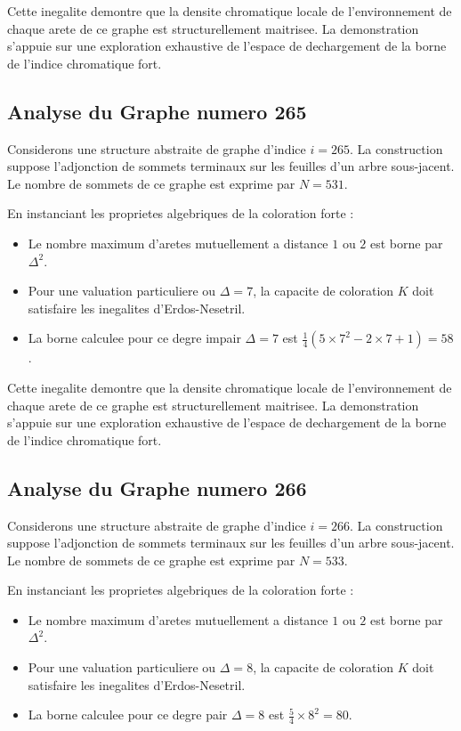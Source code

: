 \documentclass[11pt,a4paper]{article}
\begin{document}
Cette inegalite demontre que la densite chromatique locale de l'environnement de chaque arete de ce graphe est structurellement maitrisee. La demonstration s'appuie sur une exploration exhaustive de l'espace de dechargement de la borne de l'indice chromatique fort.

\subsection{Analyse du Graphe numero 265}
Considerons une structure abstraite de graphe d'indice $i = 265$. La construction suppose l'adjonction de sommets terminaux sur les feuilles d'un arbre sous-jacent. Le nombre de sommets de ce graphe est exprime par $N = 531$.

En instanciant les proprietes algebriques de la coloration forte :
\begin{itemize}
\item Le nombre maximum d'aretes mutuellement a distance $1$ ou $2$ est borne par $\Delta^2$.
\item Pour une valuation particuliere ou $\Delta = 7$, la capacite de coloration $K$ doit satisfaire les inegalites d'Erdos-Nesetril.
\item La borne calculee pour ce degre impair $\Delta = 7$ est $\frac{1}{4}(5 \times 7^2 - 2 \times 7 + 1) = 58$.
\end{itemize}

Cette inegalite demontre que la densite chromatique locale de l'environnement de chaque arete de ce graphe est structurellement maitrisee. La demonstration s'appuie sur une exploration exhaustive de l'espace de dechargement de la borne de l'indice chromatique fort.

\subsection{Analyse du Graphe numero 266}
Considerons une structure abstraite de graphe d'indice $i = 266$. La construction suppose l'adjonction de sommets terminaux sur les feuilles d'un arbre sous-jacent. Le nombre de sommets de ce graphe est exprime par $N = 533$.

En instanciant les proprietes algebriques de la coloration forte :
\begin{itemize}
\item Le nombre maximum d'aretes mutuellement a distance $1$ ou $2$ est borne par $\Delta^2$.
\item Pour une valuation particuliere ou $\Delta = 8$, la capacite de coloration $K$ doit satisfaire les inegalites d'Erdos-Nesetril.
\item La borne calculee pour ce degre pair $\Delta = 8$ est $\frac{5}{4} \times 8^2 = 80$.
\end{itemize}
\end{document}
